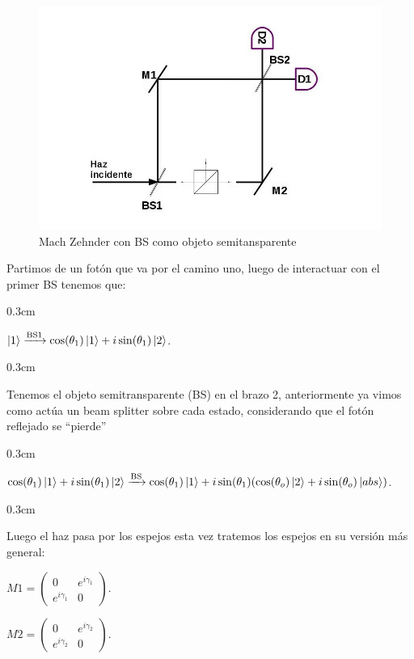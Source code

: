 \documentclass[11pt]{article}
\begin{document}
\begin{figure}[h!]
\centering
\includegraphics[width=\linewidth]{machzenhderbs.jpg}
\caption{Mach Zehnder con BS como objeto semitansparente}
\label{fig:BS2}
\end{figure}
Partimos de un fotón que va por el camino uno, luego de interactuar con el primer BS tenemos que: 

\vspace
{0.3cm}

$\ket{1}\xrightarrow{\text{BS1}}\cos
(\theta_
{1})\ket
{1}+i\sin(\theta_
{1})\ket
{2}$.

\vspace
{0.3cm}

Tenemos el objeto semitransparente (BS) en el brazo 2, anteriormente ya vimos como actúa un beam splitter
 sobre cada estado, considerando que el fotón reflejado se “pierde”

\vspace
{0.3cm}

$\cos
(\theta_
{1})\ket
{1}+i\sin(\theta_
{1})\ket
{2}\xrightarrow{\text{BS}}\cos
(\theta_
{1})\ket
{1}+i\sin(\theta_
{1})(\cos
(\theta_
{o})\ket
{2}+i\sin(\theta_
{o})\ket
{abs
})$.

\vspace
{0.3cm}

Luego el haz pasa por los espejos esta vez tratemos los espejos en su versión más general:

\vspace{0.3cm}

$M1=\begin{pmatrix} 0& e^{i\gamma_{1}} \\ e^{i\gamma_{1}} & 0 \end{pmatrix}$.

\vspace{0.3cm}

$M2=\begin{pmatrix} 0& e^{i\gamma_{2}} \\ e^{i\gamma_{2}} & 0 \end{pmatrix}$.
\end{document}
